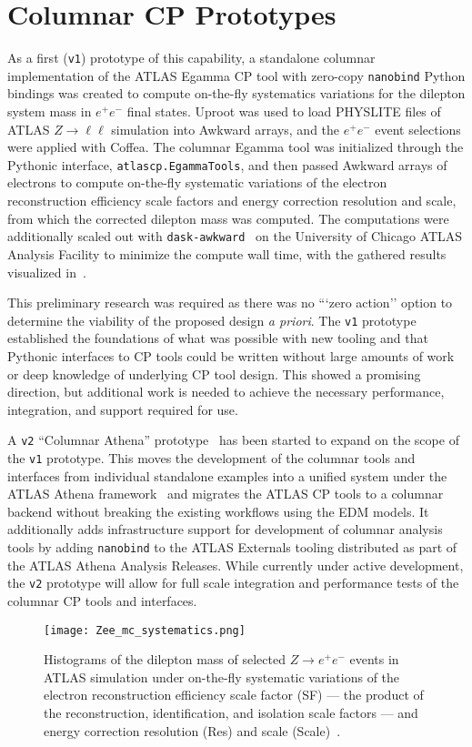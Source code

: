 \section{Columnar CP Prototypes}\label{sec:prototypes}

As a first (\texttt{v1}) prototype of this capability, a standalone columnar implementation of the ATLAS Egamma CP tool with zero-copy \texttt{nanobind} Python bindings was created to compute on-the-fly systematics variations for the dilepton system mass in $e^{+}e^{-}$ final states.
Uproot was used to load PHYSLITE files of ATLAS $Z\to \ell\ell$ simulation into Awkward arrays, and the $e^{+}e^{-}$ event selections were applied with Coffea.
The columnar Egamma tool was initialized through the Pythonic interface, \texttt{atlascp.EgammaTools}, and then passed Awkward arrays of electrons to compute on-the-fly systematic variations of the electron reconstruction efficiency scale factors and energy correction resolution and scale, from which the corrected dilepton mass was computed.
The computations were additionally scaled out with \texttt{dask-awkward}~\cite{dask_awkward_2024} on the University of Chicago ATLAS Analysis Facility to minimize the compute wall time, with the gathered results visualized in~.

This preliminary research was required as there was no ```zero action'' option to determine the viability of the proposed design \textit{a priori}.
The \texttt{v1} prototype established the foundations of what was possible with new tooling and that Pythonic interfaces to CP tools could be written without large amounts of work or deep knowledge of underlying CP tool design.
This showed a promising direction, but additional work is needed to achieve the necessary performance, integration, and support required for use.

A \texttt{v2} ``Columnar Athena'' prototype~\cite{columnar_athena} has been started to expand on the scope of the \texttt{v1} prototype.
This moves the development of the columnar tools and interfaces from individual standalone examples into a unified system under the ATLAS Athena framework~\cite{ATLAS_Athena} and migrates the ATLAS CP tools to a columnar backend without breaking the existing workflows using the EDM models.
It additionally adds infrastructure support for development of columnar analysis tools by adding \texttt{nanobind} to the ATLAS Externals tooling distributed as part of the ATLAS Athena Analysis Releases.
While currently under active development, the \texttt{v2} prototype will allow for full scale integration and performance tests of the columnar CP tools and interfaces.

\begin{figure}
    \centering
    \texttt{[image: Zee\_mc\_systematics.png]}
    \caption{Histograms of the dilepton mass of selected $Z\to e^{+}e^{-}$ events in ATLAS simulation under on-the-fly systematic variations of the electron reconstruction efficiency scale factor (SF) --- the product of the reconstruction, identification, and isolation scale factors --- and energy correction resolution (Res) and scale (Scale)~\cite{Vigl:ACAT_2024}.}
    \label{fig:Zee_mc_systematics}
\end{figure}
